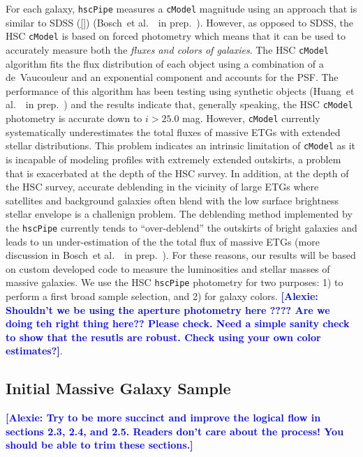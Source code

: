 \documentclass{emulateapj}
\def\etal{{\ et al.~}}
\def\cmodel{\texttt{cModel}}
\newcommand{\alexie}[1]{\textcolor{blue}{\textbf{[Alexie: #1]}}}
\begin{document}
\begin{CJK*}{UTF8}{gbsn}
       
    For each galaxy, \texttt{hscPipe} measures a \cmodel{} magnitude using an approach that is similar to SDSS (\ref{}) (Bosch\etal~in prep.~). However, as opposed to SDSS, the HSC \cmodel{} is based on forced photometry which means that it can be used to accurately measure both the \textit{fluxes and colors of galaxies}. The HSC \cmodel{} algorithm fits the flux distribution of each object using a combination of a de~Vaucouleur and 
    an exponential component and accounts for the PSF. The performance of this algorithm has been testing using synthetic objects (Huang\etal~in prep.~) and 
    the results indicate that, generally speaking, the HSC \cmodel{} photometry is 
    accurate down to $i >25.0$ mag.  
    However, \cmodel{} currently systematically underestimates the total fluxes of massive ETGs with extended stellar distributions. This problem indicates an intrinsic limitation of \cmodel{} as it is incapable of
    modeling profiles with extremely extended outskirts, a problem that is exacerbated at the depth of 
    the HSC survey. In addition, at the depth of the HSC survey, accurate deblending in the vicinity of large ETGs where satellites and background galaxies often blend with the low surface brightness stellar envelope is a challenign problem. The deblending method implemented by the \texttt{hscPipe} currently tends to 
    ``over-deblend'' the outskirts of bright galaxies and leads to un under-estimation of the the total flux of massive ETGs (more discussion in 
    Bosch\etal~in prep.~).  For these reasons, our results will be based on custom developed code to measure the luminosities and stellar masses of massive galaxies. We use the HSC \texttt{hscPipe} photometry for two purposes: 1) to perform a first broad sample selection, and 2) for galaxy colors. \alexie{Shouldn't we be using the aperture photometry here ???? Are we doing teh right thing here?? Please check. Need a simple sanity check to show that the resutls are robust. Check using your own color estimates?}.
    
\subsection{Initial Massive Galaxy Sample}
    \label{ssec:initial}
    
    \alexie{Try to be more succinct and improve the logical flow in sections 2.3, 2.4, and 2.5. Readers don't care about the process! You should be able to trim these sections.}
    

\end{CJK*}
\end{document}

